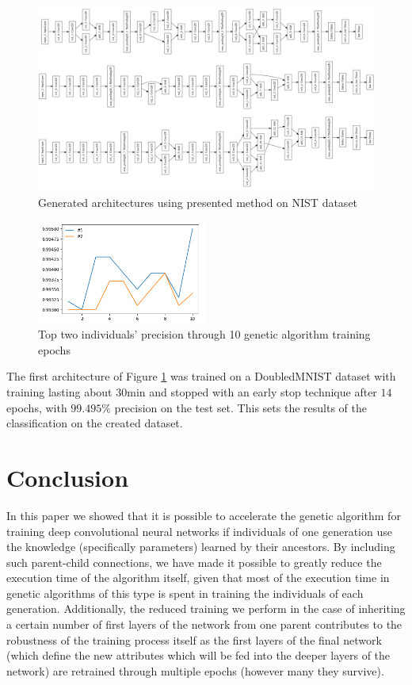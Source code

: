 \documentclass[eng]{simposium}
\begin{document}
\begin{figure}[!ht] 
  \centering 
  \includegraphics[width=1\textwidth]{arhitekture.png} 
  \caption{Generated architectures using presented method on NIST dataset} 
  \label{fig:architectures} 
\end{figure} 

\begin{figure}[!ht] 
  \centering 
  \includegraphics[width=0.5\textwidth]{top1.png} 
  \caption{Top two individuals' precision through 10 genetic algorithm training epochs} 
  \label{fig:top2} 
\end{figure} 

The first architecture of Figure \ref{fig:architectures} was trained on a DoubledMNIST dataset with training lasting about  
$30$min and stopped with an early stop technique after $14$ epochs, with $99.495\%$ precision on the test set.  
This sets the results of the classification on the created dataset.  

\section{Conclusion} 

In this paper we showed that it is possible to accelerate the genetic algorithm for training deep convolutional neural networks 
if individuals of one generation use the knowledge (specifically parameters) learned by their ancestors. 
By including such parent-child connections, we have made it possible to greatly reduce the execution time of the algorithm itself, given that 
most of the execution time in genetic algorithms of this type is spent in training the individuals of each generation. 
Additionally, the reduced training we perform in the case of inheriting a certain number of first layers of the network from one parent 
contributes to the robustness of the training process itself as the first layers of the final network (which define the new attributes 
which will be fed into the deeper layers of the network) are retrained through multiple epochs (however many they survive). 
\end{document}
